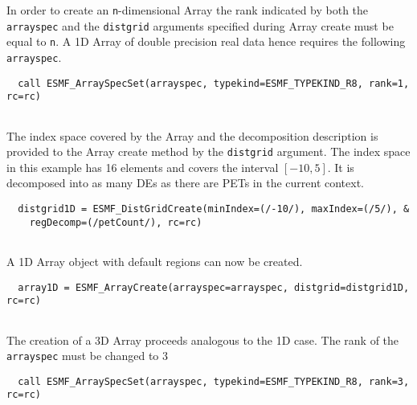    In order to create an {\tt n}-dimensional Array the rank indicated by both
   the {\tt arrayspec} and the {\tt distgrid} arguments specified during Array
   create must be equal to {\tt n}. A 1D Array of double precision real data
   hence requires the following {\tt arrayspec}. 

 \begin{verbatim}
  call ESMF_ArraySpecSet(arrayspec, typekind=ESMF_TYPEKIND_R8, rank=1, rc=rc)
 
\end{verbatim}
 

   The index space covered by the Array and the decomposition description is
   provided to the Array create method by the {\tt distgrid} argument. The index
   space in this example has 16 elements and covers the interval $[-10, 5]$. It is 
   decomposed into as many DEs as there are PETs in the current context. 

 \begin{verbatim}
  distgrid1D = ESMF_DistGridCreate(minIndex=(/-10/), maxIndex=(/5/), &
    regDecomp=(/petCount/), rc=rc)
 
\end{verbatim}
 

   A 1D Array object with default regions can now be created. 

 \begin{verbatim}
  array1D = ESMF_ArrayCreate(arrayspec=arrayspec, distgrid=distgrid1D, rc=rc)
 
\end{verbatim}
 

   
   The creation of a 3D Array proceeds analogous to the 1D case. The rank of the
   {\tt arrayspec} must be changed to 3 

 \begin{verbatim}
  call ESMF_ArraySpecSet(arrayspec, typekind=ESMF_TYPEKIND_R8, rank=3, rc=rc)
 
\end{verbatim}
 
